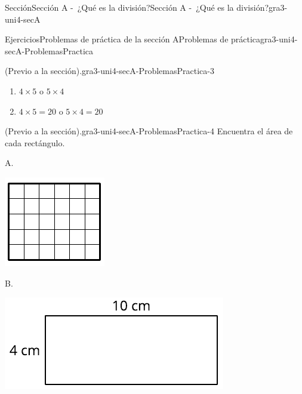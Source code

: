 \documentclass[oneside,10pt,]{article}
\begin{document}
\begin{sectionptx}{Sección}{Sección A -~¿Qué es la división?}{}{Sección A -~¿Qué es la división?}{}{}{gra3-uni4-secA}
\begin{exercises-subsection}{Ejercicios}{Problemas de práctica de la sección A}{}{Problemas de práctica}{}{}{gra3-uni4-secA-ProblemasPractica}
\begin{divisionexercise}{1}{(Previo a la sección).}{}{gra3-uni4-secA-ProblemasPractica-3}
\begin{enumerate}[label={(\alph*)}]
\item{}\(4\times 5\) o \(5\times 4\)%
\item{}\(4\times 5=20\) o \(5\times 4=20\)%
\end{enumerate}
\end{divisionexercise}%
\begin{divisionexercise}{2}{(Previo a la sección).}{}{gra3-uni4-secA-ProblemasPractica-4}%
Encuentra el área de cada rectángulo.%
\begin{sidebyside}{2}{0.05}{0.05}{0.1}%
\begin{sbspanel}{0.3}%
A.%
\par
\includegraphics[width=\linewidth]{external/svg-source/tikz-file-151669-scale13.pdf}
\end{sbspanel}%
\begin{sbspanel}{0.5}%
B.%
\par
\includegraphics[width=\linewidth]{external/svg-source/tikz-file-151670-scale13.pdf}

\end{sbspanel}
\end{sidebyside}
\end{divisionexercise}
\end{exercises-subsection}
\end{sectionptx}
\end{document}
